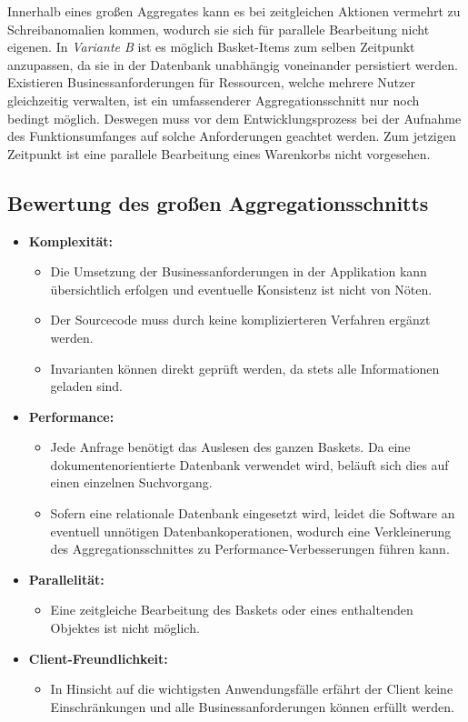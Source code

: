 Innerhalb eines großen Aggregates kann es bei zeitgleichen Aktionen vermehrt zu Schreibanomalien kommen, wodurch sie sich für parallele Bearbeitung nicht eigenen. In \emph{Variante B} ist es möglich Basket-Items zum selben Zeitpunkt anzupassen, da sie in der Datenbank unabhängig voneinander persistiert werden. Existieren Businessanforderungen für Ressourcen, welche mehrere Nutzer gleichzeitig verwalten, ist ein umfassenderer Aggregationsschnitt nur noch bedingt möglich. Deswegen muss vor dem Entwicklungsprozess bei der Aufnahme des Funktionsumfanges auf solche Anforderungen geachtet werden. Zum jetzigen Zeitpunkt ist eine parallele Bearbeitung eines Warenkorbs nicht vorgesehen.

\subsection{Bewertung des großen Aggregationsschnitts}

\begin{itemize}[noitemsep,nolistsep,topsep=-2pt]
	\item \textbf{Komplexität: } {
		\begin{itemize}
			\item {Die Umsetzung der Businessanforderungen in der Applikation kann übersichtlich erfolgen und eventuelle Konsistenz ist nicht von Nöten. }
			\item {Der Sourcecode muss durch keine komplizierteren Verfahren ergänzt werden.}
			\item {Invarianten können direkt geprüft werden, da stets alle Informationen geladen sind. }
		\end{itemize}
	}
	\item \textbf{Performance: } {
		\begin{itemize}
			\item Jede Anfrage benötigt das Auslesen des ganzen Baskets. Da eine dokumentenorientierte Datenbank verwendet wird, beläuft sich dies auf einen einzelnen Suchvorgang.
			\item Sofern eine relationale Datenbank eingesetzt wird, leidet die Software an eventuell unnötigen Datenbankoperationen, wodurch eine Verkleinerung des Aggregationsschnittes zu Performance-Verbesserungen führen kann.
		\end{itemize}
	}
	\item \textbf{Parallelität: } {
		\begin{itemize}
			\item Eine zeitgleiche Bearbeitung des Baskets oder eines enthaltenden Objektes ist nicht möglich.
		\end{itemize}	
	}
	\item \textbf{Client-Freundlichkeit: } {
		\begin{itemize}
			\item In Hinsicht auf die wichtigsten Anwendungsfälle erfährt der Client keine Einschränkungen und alle Businessanforderungen können erfüllt werden.
		\end{itemize}
	}
\end{itemize}


